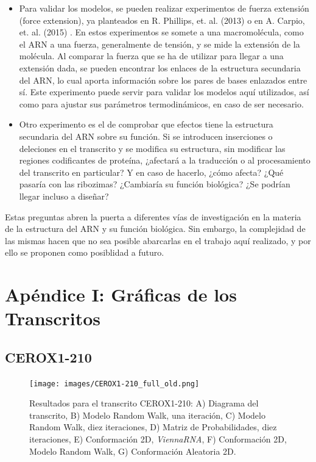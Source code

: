 \documentclass[a4paper,11pt,titlepage]{article}
\theoremstyle{definition}
\begin{document}
\begin{itemize}
    \item Para validar los modelos, se pueden realizar experimentos de fuerza extensión (force extension), ya planteados en R. Phillips, et. al. (2013) \cite{phillips} o en A. Carpio, et. al. (2015) \cite{bonilla}. En estos experimentos se somete a una macromolécula, como el ARN a una fuerza, generalmente de tensión, y se mide la extensión de la molécula. Al comparar la fuerza que se ha de utilizar para llegar a una extensión dada, se pueden encontrar los enlaces de la estructura secundaria del ARN, lo cual aporta información sobre los pares de bases enlazados entre sí. Este experimento puede servir para validar los modelos aquí utilizados, así como para ajustar sus parámetros termodinámicos, en caso de ser necesario.
    \item Otro experimento es el de comprobar que efectos tiene la estructura secundaria del ARN sobre su función. Si se introducen inserciones o deleciones en el transcrito y se modifica su estructura, sin modificar las regiones codificantes de proteína, ¿afectará a la traducción o al procesamiento del transcrito en particular? Y en caso de hacerlo, ¿cómo afecta? ¿Qué pasaría con las ribozimas? ¿Cambiaría su función biológica? ¿Se podrían llegar incluso a diseñar?
\end{itemize}

Estas preguntas abren la puerta a diferentes vías de investigación en la materia de la estructura del ARN y su función biológica. Sin embargo, la complejidad de las mismas hacen que no sea posible abarcarlas en el trabajo aquí realizado, y por ello se proponen como posiblidad a futuro.


\newpage
\printbibliography[title=Bibliografía, heading=bibnumbered]\label{sec:refs}

\newpage
\section{Apéndice I: Gráficas de los Transcritos}\label{sec:graphs}

\subsection*{CEROX1-210}\label{subsec:gene1}

\begin{figure}[H]
    \centering
    \texttt{[image: images/CEROX1-210\_full\_old.png]}
    \small{\caption{Resultados para el transcrito CEROX1-210: A) Diagrama del transcrito, B) Modelo Random Walk, una iteración, C) Modelo Random Walk, diez iteraciones, D) Matriz de Probabilidades, diez iteraciones, E) Conformación 2D, \textit{ViennaRNA}, F) Conformación 2D, Modelo Random Walk, G) Conformación Aleatoria 2D.}\label{fig:CEROX1-210-diag}}\normalsize
\end{figure}
\end{document}
